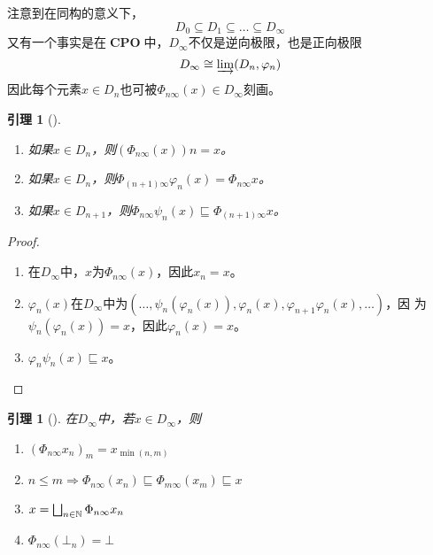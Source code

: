 \documentclass[11pt]{article}
\DeclareMathOperator{\CPO}{\textbf{CPO}}
\newtheorem{lemma}[theorem]{引理}
\begin{document}
注意到在同构的意义下，
\begin{equation*}
D_0\subseteq D_1\subseteq\dots\subseteq D_\infty
\end{equation*}
又有一个事实是在\(\CPO\)中，\(D_\infty\)不仅是逆向极限，也是正向极限
\begin{equation*}
D_\infty\cong\varinjlim(D_n,\varphi_n)
\end{equation*}
因此每个元素\(x\in D_n\)也可被\(\Phi_{n\infty}(x)\in D_\infty\)刻画。

\begin{lemma}[]
\label{18.2.7}
\begin{enumerate}
\item 如果\(x\in D_n\)，则\((\Phi_{n\infty}(x))n=x\)。
\item 如果\(x\in D_n\)，则\(\Phi_{(n+1)\infty}\varphi_n(x)=\Phi_{n\infty}x\)。
\item 如果\(x\in D_{n+1}\)，则\(\Phi_{n\infty}\psi_n(x)\sqsubseteq \Phi_{(n+1)\infty}x\)。
\end{enumerate}
\end{lemma}

\begin{proof}
\begin{enumerate}
\item 在\(D_\infty\)中，\(x\)为\(\Phi_{n\infty}(x)\)，因此\(x_n=x\)。
\item \(\varphi_n(x)\)在\(D_\infty\)中为\((\dots,\psi_n(\varphi_n(x)),\varphi_n(x),\varphi_{n+1}\varphi_n(x),\dots)\)，因
为\(\psi_n(\varphi_n(x))=x\)，因此\(\varphi_n(x)=x\)。
\item \(\varphi_n\psi_n(x)\sqsubseteq x\)。
\end{enumerate}
\end{proof}

\begin{lemma}[]
\label{18.2.8}
在\(D_\infty\)中，若\(x\in D_\infty\)，则
\begin{enumerate}
\item \((\Phi_{n\infty}x_n)_m=x_{\min(n,m)}\)
\item \(n\le m\Rightarrow \Phi_{n\infty}(x_n)\sqsubseteq\Phi_{m\infty}(x_m)\sqsubseteq x\)
\item \(x=\bigsqcup_{n\in\mathbb{N}}\Phi_{n\infty}x_n\)
\item \(\Phi_{n\infty}(\bot_n)=\bot\)
\end{enumerate}
\end{lemma}
\end{document}
